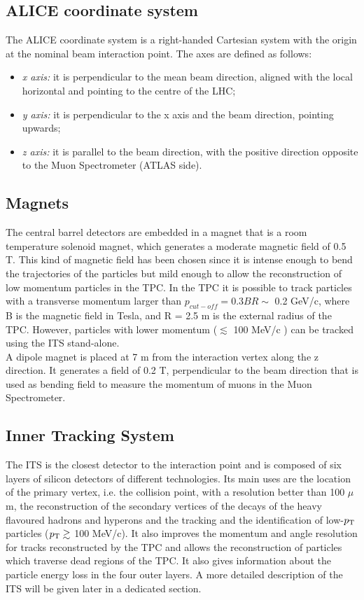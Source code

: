 \subsection{ALICE coordinate system}
The ALICE coordinate system is a right-handed Cartesian system with the origin at the nominal beam interaction point. The axes are defined as follows:
\begin{itemize}
 \item \textit{x axis:} it is perpendicular to the mean beam direction, aligned with the local horizontal and pointing to the centre of the LHC;
 \item \textit{y axis:} it is perpendicular to the x axis and the beam direction, pointing upwards;
 \item \textit{z axis:} it is parallel to the beam direction, with the positive direction opposite to the Muon Spectrometer (ATLAS side).
\end{itemize}
\subsection*{Magnets}
The central barrel detectors are embedded in a magnet that is a room temperature solenoid magnet, which generates a moderate magnetic field of 0.5 T. This kind of magnetic field has been chosen since it is intense enough to bend the trajectories of the particles but mild enough to allow the reconstruction of low momentum particles in the TPC. In the TPC it is possible to track particles with a transverse momentum larger than $p_{cut-off} = 0.3 BR \sim$ 0.2 GeV/c, where B is the magnetic field in Tesla, and R = 2.5 m is the external radius of the TPC. However, particles with lower momentum ($\lesssim$ 100 MeV/c \cite{raro}) can be tracked using the ITS stand-alone.\\
A dipole magnet is placed at 7 m from the interaction vertex along the z direction. It generates a field of 0.2 T, perpendicular to the beam direction that is used as bending field to measure the momentum of muons in the Muon Spectrometer.
\subsection*{Inner Tracking System}
The ITS is the closest detector to the interaction point and is composed of six layers of silicon detectors of different technologies. Its main uses are the location of the primary vertex, i.e. the collision point, with a resolution better than 100 $\mu$m, the reconstruction of the secondary vertices of the decays of the heavy flavoured hadrons and hyperons and the tracking and the identification of low-$p_\text{T}$ particles ($p_\text{T} \gtrsim$  100 MeV/c). It also improves the momentum and angle resolution for tracks reconstructed by the TPC and allows the reconstruction of particles which traverse dead regions of the TPC. It also gives information about the particle energy loss in the four outer layers. A more detailed description of the ITS will be given later in a dedicated section.
